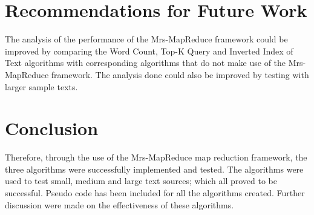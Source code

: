 \documentclass[twocolumn, 11pt]{IEEEtran}
\begin{document}
\section{Recommendations for Future Work }

The analysis of the performance of the Mrs-MapReduce framework could be improved by comparing the Word Count, Top-K Query and Inverted Index of Text algorithms with corresponding algorithms that do not make use of the Mrs-MapReduce framework. The analysis done could also be improved by testing with larger sample texts. 

\section{Conclusion}

Therefore, through the use of the Mrs-MapReduce map reduction framework, the three algorithms were successfully implemented and tested. The algorithms were used to test small, medium and large text sources; which all proved to be successful. Pseudo code has been included for all the algorithms created. Further discussion were made on the effectiveness of these algorithms.




\end{document}
